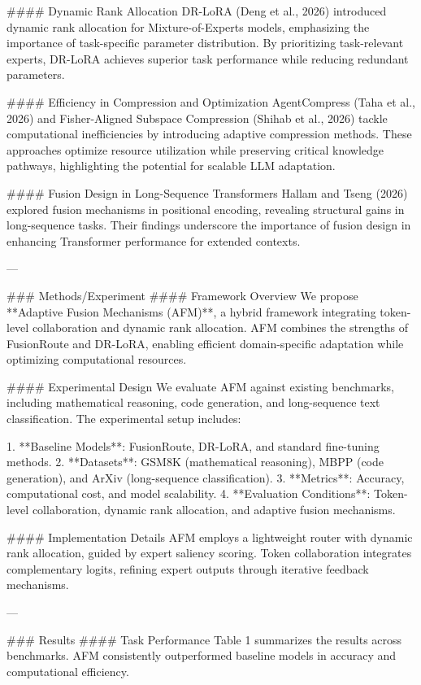 #### Dynamic Rank Allocation  
DR-LoRA (Deng et al., 2026) introduced dynamic rank allocation for Mixture-of-Experts models, emphasizing the importance of task-specific parameter distribution. By prioritizing task-relevant experts, DR-LoRA achieves superior task performance while reducing redundant parameters.

#### Efficiency in Compression and Optimization  
AgentCompress (Taha et al., 2026) and Fisher-Aligned Subspace Compression (Shihab et al., 2026) tackle computational inefficiencies by introducing adaptive compression methods. These approaches optimize resource utilization while preserving critical knowledge pathways, highlighting the potential for scalable LLM adaptation.

#### Fusion Design in Long-Sequence Transformers  
Hallam and Tseng (2026) explored fusion mechanisms in positional encoding, revealing structural gains in long-sequence tasks. Their findings underscore the importance of fusion design in enhancing Transformer performance for extended contexts.

---

### Methods/Experiment  
#### Framework Overview  
We propose **Adaptive Fusion Mechanisms (AFM)**, a hybrid framework integrating token-level collaboration and dynamic rank allocation. AFM combines the strengths of FusionRoute and DR-LoRA, enabling efficient domain-specific adaptation while optimizing computational resources.

#### Experimental Design  
We evaluate AFM against existing benchmarks, including mathematical reasoning, code generation, and long-sequence text classification. The experimental setup includes:

1. **Baseline Models**: FusionRoute, DR-LoRA, and standard fine-tuning methods.
2. **Datasets**: GSM8K (mathematical reasoning), MBPP (code generation), and ArXiv (long-sequence classification).
3. **Metrics**: Accuracy, computational cost, and model scalability.
4. **Evaluation Conditions**: Token-level collaboration, dynamic rank allocation, and adaptive fusion mechanisms.

#### Implementation Details  
AFM employs a lightweight router with dynamic rank allocation, guided by expert saliency scoring. Token collaboration integrates complementary logits, refining expert outputs through iterative feedback mechanisms.

---

### Results  
#### Task Performance  
Table 1 summarizes the results across benchmarks. AFM consistently outperformed baseline models in accuracy and computational efficiency.

